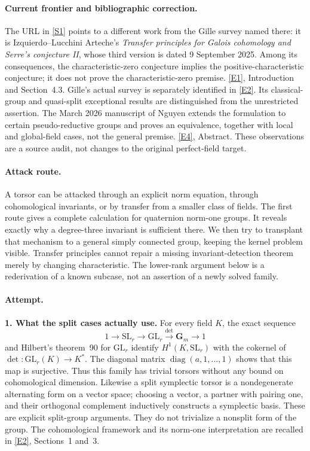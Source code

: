\documentclass[11pt,a4paper]{article}
\newcommand{\sref}[2]{\hyperlink{source:#1:#2}{[S#2]}}
\newcommand{\eref}[2]{\hyperlink{extra:#1:#2}{[E#2]}}
\numberwithin{equation}{section}
\begin{document}
\paragraph{Current frontier and bibliographic correction.}
The URL in \sref{226}{1} points to a different work from the Gille survey
named there: it is Izquierdo--Lucchini Arteche's \emph{Transfer principles
for Galois cohomology and Serre's conjecture II}, whose third version is
dated 9 September 2025. Among its consequences, the characteristic-zero
conjecture implies the positive-characteristic conjecture; it does not
prove the characteristic-zero premise. \eref{226}{1}, Introduction and
Section~4.3. Gille's actual survey is separately identified in
\eref{226}{2}. Its classical-group and quasi-split exceptional results
are distinguished from the unrestricted assertion.
The March 2026 manuscript of Nguyen extends the formulation to certain
pseudo-reductive groups and proves an equivalence, together with local
and global-field cases, not the general premise. \eref{226}{4}, Abstract.
These observations are a source audit, not changes to the original
perfect-field target.

\paragraph{Attack route.}
A torsor can be attacked through an explicit norm equation, through
cohomological invariants, or by transfer from a smaller class of fields.
The first route gives a complete calculation for quaternion norm-one
groups. It reveals exactly why a degree-three invariant is sufficient
there. We then try to transplant that mechanism to a general simply
connected group, keeping the kernel problem visible. Transfer principles
cannot repair a missing invariant-detection theorem merely by changing
characteristic. The lower-rank argument below is a rederivation of a
known subcase, not an assertion of a newly solved family.

\paragraph{Attempt.}
\textbf{1. What the split cases actually use.}
For every field $K$, the exact sequence
\[
 1\longrightarrow\mathrm{SL}_r\longrightarrow\mathrm{GL}_r
       \xrightarrow{\det}\mathbf G_m\longrightarrow1
\]
and Hilbert's theorem~90 for $\mathrm{GL}_r$ identify
$H^1(K,\mathrm{SL}_r)$ with the cokernel of
$\det:\mathrm{GL}_r(K)\to K^*$. The diagonal matrix
$\operatorname{diag}(a,1,\ldots,1)$ shows that this map is surjective.
Thus this family has trivial torsors without any bound on cohomological
dimension. Likewise a split symplectic torsor is a nondegenerate
alternating form on a vector space; choosing a vector, a partner with
pairing one, and their orthogonal complement inductively constructs a
symplectic basis. These are explicit split-group arguments. They do
not trivialize a nonsplit form of the group. The cohomological framework
and its norm-one interpretation are recalled in \eref{226}{2}, Sections~1
and~3.
\end{document}
